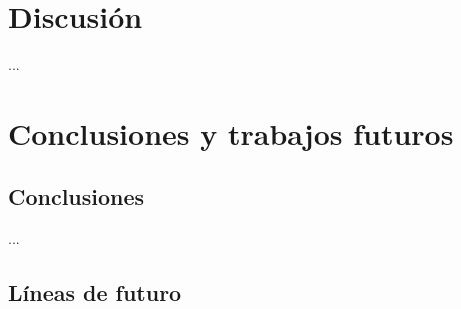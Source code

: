 \documentclass[IB,BIB]{TFUOC}%
\begin{document}
\chapter{Discusión}
\label{chap:Discusión}


...




\chapter{Conclusiones y trabajos futuros}
\label{chap:Conclusiones y trabajos futuros}

\section{Conclusiones}
\label{sec:Conclusiones}

% 

...


\section{Líneas de futuro}
\label{sec:Líneas de futuro}
\end{document}
